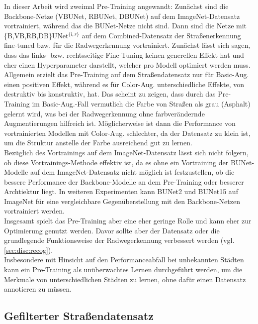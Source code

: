 In dieser Arbeit wird zweimal Pre-Training angewandt: Zunächst sind die Backbone-Netze (VBUNet, RBUNet, DBUNet) 
auf dem ImageNet-Datensatz vortrainiert, während das die BUNet-Netze nicht sind. Dann sind die Netze 
mit \{B,VB,RB,DB\}UNet$^{\{l,r\}}$ auf dem Combined-Datensatz der Straßenerkennung fine-tuned bzw. für die 
Radwegerkennung vortrainiert. Zunächst lässt sich sagen, dass das links- bzw. rechtsseitige Fine-Tuning 
keinen generellen Effekt hat und eher einen Hyperparameter darstellt, welcher pro Modell optimiert werden muss. 
Allgemein erzielt das Pre-Training auf dem Straßendatensatz nur für Basic-Aug. einen positiven Effekt, 
während es für Color-Aug. unterschiedliche Effekte, von destruktiv bis konstruktiv, hat. 
Das scheint zu zeigen, dass durch das Pre-Training im Basic-Aug.-Fall vermutlich die Farbe von Straßen als 
grau (Asphalt) gelernt wird, was bei der Radwegerkennung ohne farbverändernde Augmentierungen hilfreich ist.  
Möglicherweise ist dann die Performance von vortrainierten Modellen mit Color-Aug. schlechter, 
da der Datensatz zu klein ist, um die Struktur anstelle der Farbe ausreichend gut zu lernen. \\ 
Bezüglich des Vortrainings auf dem ImageNet-Datensatz lässt sich nicht folgern, 
ob diese Vortrainings-Methode effektiv ist, da es ohne ein Vortraining der BUNet-Modelle auf dem ImageNet-Datensatz 
nicht möglich ist festzustellen, ob die bessere Performance der Backbone-Modelle an dem Pre-Training oder 
besserer Archtiektur liegt. In weiteren Experimenten kann BUNet2 und BUNet15 auf ImageNet für eine vergleichbare Gegenüberstellung mit den Backbone-Netzen vortrainiert werden. \\
Insgesamt spielt das Pre-Training aber eine eher geringe Rolle und kann eher zur Optimierung genutzt werden. 
Davor sollte aber der Datensatz oder die grundlegende Funktionsweise der Radwegerkennung verbessert werden (vgl. \autoref{sec:disc:recog}). \\
Insbesondere mit Hinsicht auf den Performanceabfall bei unbekannten Städten kann ein Pre-Training 
als unüberwachtes Lernen durchgeführt werden, um die Merkmale von unterschiedlichen Städten zu lernen, 
ohne dafür einen Datensatz annotieren zu müssen. 

\subsection{Gefilterter Straßendatensatz}

\newcommand{\overbar}[1]{\mkern 8mu\overline{\mkern-8mu#1\mkern-8mu}\mkern 8mu}


